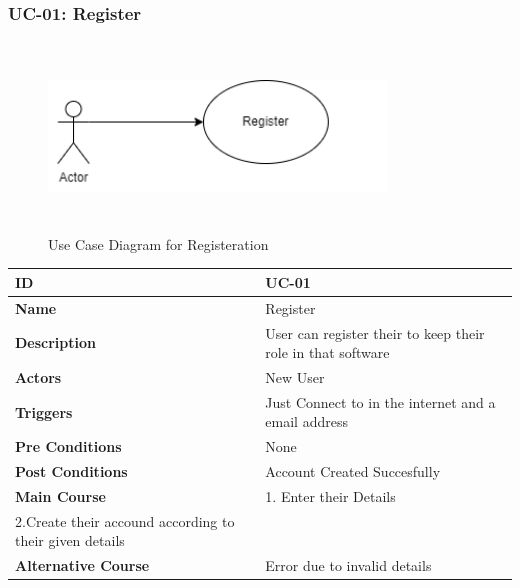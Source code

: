 \setcounter{figure}{0}
\subsubsection{UC-01: Register}
\begin{figure}[H]
    \includegraphics[height=5cm, width=0.8\textwidth]{./diagrams/Use Case/u1.png}
    \centering
    \caption{Use Case Diagram for Registeration}
    \label{figure1}
\end{figure}

\begin{center}
    \begin{tabularx}{\textwidth}{|l|X|}
        \hline
        \textbf{ID}                 & UC-01                                                       \\
        \hline
        \textbf{Name}               & Register                                                    \\
        \hline
        \textbf{Description}        & User can register their to keep their role in that software \\
        \hline
        \textbf{Actors}             & New User                                                    \\
        \hline
        \textbf{Triggers}           & Just Connect to in the internet and a email address         \\
        \hline
        \textbf{Pre Conditions}     & None                                                        \\
        \hline
        \textbf{Post Conditions}    & Account Created Succesfully                                 \\
        \hline
        \textbf{Main Course}        & 1. Enter their Details                                      \\2.Create their accound according to their given details \\
        \hline
        \textbf{Alternative Course} & Error due to invalid details                                \\
        \hline
    \end{tabularx}
\end{center}
\newpage


